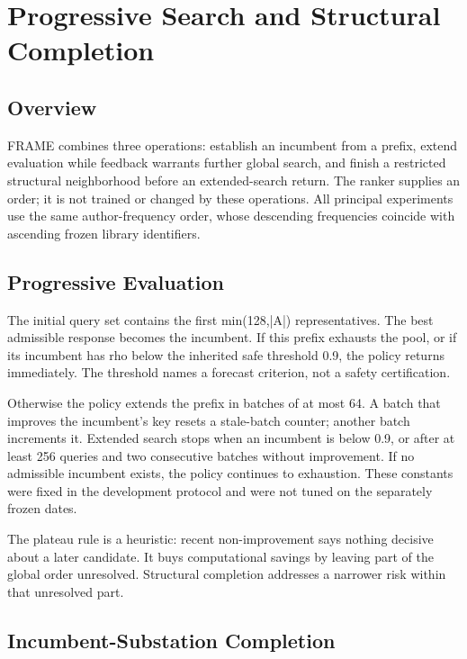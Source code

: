 \documentclass[letterpaper]{article}
\begin{document}
\section{Progressive Search and Structural Completion}

\subsection{Overview}

FRAME combines three operations: establish an incumbent from a prefix, extend evaluation while feedback warrants further global search, and finish a restricted structural neighborhood before an extended-search return. The ranker supplies an order; it is not trained or changed by these operations. All principal experiments use the same author-frequency order, whose descending frequencies coincide with ascending frozen library identifiers.


\subsection{Progressive Evaluation}

The initial query set contains the first min(128,|A|) representatives. The best admissible response becomes the incumbent. If this prefix exhausts the pool, or if its incumbent has rho below the inherited safe threshold 0.9, the policy returns immediately. The threshold names a forecast criterion, not a safety certification.


Otherwise the policy extends the prefix in batches of at most 64. A batch that improves the incumbent's key resets a stale-batch counter; another batch increments it. Extended search stops when an incumbent is below 0.9, or after at least 256 queries and two consecutive batches without improvement. If no admissible incumbent exists, the policy continues to exhaustion. These constants were fixed in the development protocol and were not tuned on the separately frozen dates.


The plateau rule is a heuristic: recent non-improvement says nothing decisive about a later candidate. It buys computational savings by leaving part of the global order unresolved. Structural completion addresses a narrower risk within that unresolved part.


\subsection{Incumbent-Substation Completion}
\end{document}
